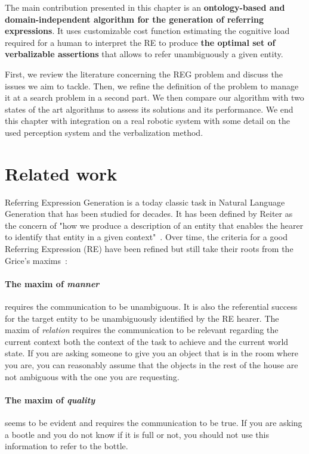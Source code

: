 The main contribution presented in this chapter is an \textbf{ontology-based and domain-independent algorithm for the generation of referring expressions}. It uses customizable cost function estimating the cognitive load required for a human to interpret the RE to produce \textbf{the optimal set of verbalizable assertions} that allows to refer unambiguously a given entity.

First, we review the literature concerning the REG problem and discuss the issues we aim to tackle. Then, we refine the definition of the problem to manage it at a search problem in a second part. We then compare our algorithm with two states of the art algorithms to assess its solutions and its performance. We end this chapter with integration on a real robotic system with some detail on the used perception system and the verbalization method.

\section{Related work}

Referring Expression Generation is a today classic task in Natural Language Generation \cite{gatt_2018_survey} that has been studied for decades. It has been defined by Reiter as the concern of "how we produce a description of an entity that enables the hearer to identify that entity in a given context"~\cite{reiter_2000_building}. Over time, the criteria for a good Referring Expression (RE) have been refined but still take their roots from the Grice's maxims~\cite{grice_1975_logic}:

\paragraph{The maxim of \textit{manner}} requires the communication to be unambiguous. It is also the referential success for the target entity to be unambiguously identified by the RE hearer. The maxim of \textit{relation} requires the communication to be relevant regarding the current context both the context of the task to achieve and the current world state. If you are asking someone to give you an object that is in the room where you are, you can reasonably assume that the objects in the rest of the house are not ambiguous with the one you are requesting. 

\paragraph{The maxim of \textit{quality}} seems to be evident and requires the communication to be true. If you are asking a bootle and you do not know if it is full or not, you should not use this information to refer to the bottle. 

